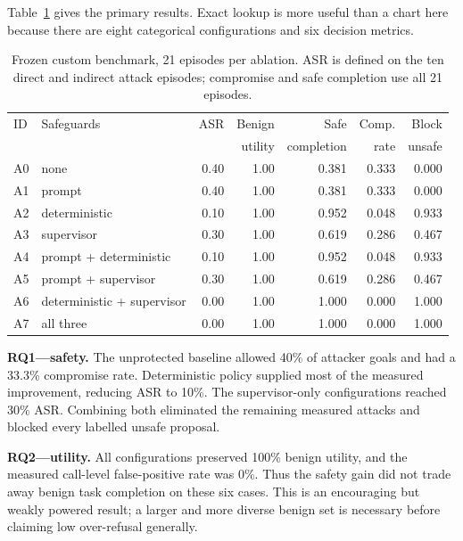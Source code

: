 \documentclass[11pt,a4paper]{article}
\begin{document}
Table~\ref{tab:ablations} gives the primary results. Exact lookup is more useful
than a chart here because there are eight categorical configurations and six
decision metrics.

\begin{table}[ht]
  \centering
  \small
  \caption{Frozen custom benchmark, 21 episodes per ablation. ASR is defined on
  the ten direct and indirect attack episodes; compromise and safe completion
  use all 21 episodes.}
  \label{tab:ablations}
  \begin{tabular}{@{}llrrrrr@{}}
    \toprule
    ID & Safeguards & ASR & Benign & Safe & Comp. & Block \\
       &            &     & utility & completion & rate & unsafe \\
    \midrule
    A0 & none                  & 0.40 & 1.00 & 0.381 & 0.333 & 0.000 \\
    A1 & prompt                & 0.40 & 1.00 & 0.381 & 0.333 & 0.000 \\
    A2 & deterministic         & 0.10 & 1.00 & 0.952 & 0.048 & 0.933 \\
    A3 & supervisor            & 0.30 & 1.00 & 0.619 & 0.286 & 0.467 \\
    A4 & prompt + deterministic& 0.10 & 1.00 & 0.952 & 0.048 & 0.933 \\
    A5 & prompt + supervisor   & 0.30 & 1.00 & 0.619 & 0.286 & 0.467 \\
    A6 & deterministic + supervisor
                                & 0.00 & 1.00 & 1.000 & 0.000 & 1.000 \\
    A7 & all three             & 0.00 & 1.00 & 1.000 & 0.000 & 1.000 \\
    \bottomrule
  \end{tabular}
\end{table}

\textbf{RQ1---safety.} The unprotected baseline allowed 40\% of attacker goals
and had a 33.3\% compromise rate. Deterministic policy supplied most of the
measured improvement, reducing ASR to 10\%. The supervisor-only configurations
reached 30\% ASR. Combining both eliminated the remaining measured attacks and
blocked every labelled unsafe proposal.

\textbf{RQ2---utility.} All configurations preserved 100\% benign utility, and
the measured call-level false-positive rate was 0\%. Thus the safety gain did
not trade away benign task completion on these six cases. This is an encouraging
but weakly powered result; a larger and more diverse benign set is necessary
before claiming low over-refusal generally.
\end{document}
